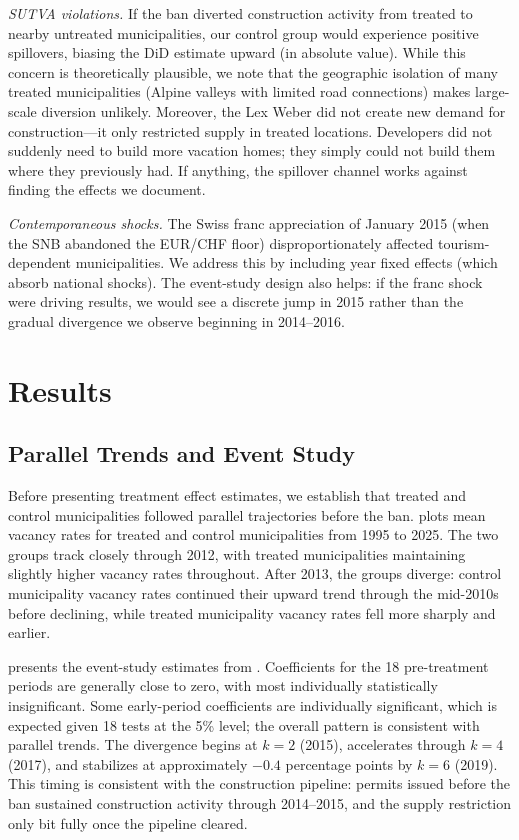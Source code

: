 \documentclass[12pt]{article}
\begin{document}
\textit{SUTVA violations.} If the ban diverted construction activity from treated to nearby untreated municipalities, our control group would experience positive spillovers, biasing the DiD estimate upward (in absolute value). While this concern is theoretically plausible, we note that the geographic isolation of many treated municipalities (Alpine valleys with limited road connections) makes large-scale diversion unlikely. Moreover, the Lex Weber did not create new demand for construction---it only restricted supply in treated locations. Developers did not suddenly need to build more vacation homes; they simply could not build them where they previously had. If anything, the spillover channel works against finding the effects we document.

\textit{Contemporaneous shocks.} The Swiss franc appreciation of January 2015 (when the SNB abandoned the EUR/CHF floor) disproportionately affected tourism-dependent municipalities. We address this by including year fixed effects (which absorb national shocks). The event-study design also helps: if the franc shock were driving results, we would see a discrete jump in 2015 rather than the gradual divergence we observe beginning in 2014--2016.


\section{Results}
\label{sec:results}

\subsection{Parallel Trends and Event Study}

Before presenting treatment effect estimates, we establish that treated and control municipalities followed parallel trajectories before the ban.  plots mean vacancy rates for treated and control municipalities from 1995 to 2025. The two groups track closely through 2012, with treated municipalities maintaining slightly higher vacancy rates throughout. After 2013, the groups diverge: control municipality vacancy rates continued their upward trend through the mid-2010s before declining, while treated municipality vacancy rates fell more sharply and earlier.

 presents the event-study estimates from . Coefficients for the 18 pre-treatment periods are generally close to zero, with most individually statistically insignificant. Some early-period coefficients are individually significant, which is expected given 18 tests at the 5\% level; the overall pattern is consistent with parallel trends. The divergence begins at $k = 2$ (2015), accelerates through $k = 4$ (2017), and stabilizes at approximately $-0.4$ percentage points by $k = 6$ (2019). This timing is consistent with the construction pipeline: permits issued before the ban sustained construction activity through 2014--2015, and the supply restriction only bit fully once the pipeline cleared.
\end{document}
